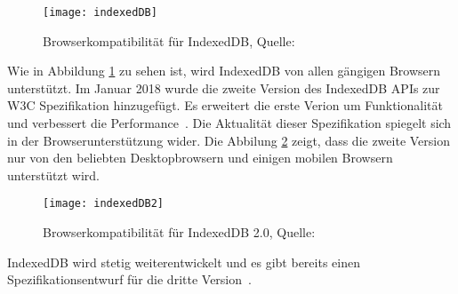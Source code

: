 \begin{figure}[H]
	\centering
	\texttt{[image: indexedDB]}
	\grayRule
	\caption{Browserkompatibilität für IndexedDB, Quelle: ~\cite{caniuse-idb}}
	\label{fig:indexedDB}
\end{figure}
Wie in Abbildung \ref{fig:indexedDB} zu sehen ist, wird IndexedDB von allen gängigen Browsern unterstützt. 
%
Im Januar 2018 wurde die zweite Version des IndexedDB \glspl{API} zur W3C Spezifikation hinzugefügt. Es erweitert die erste Verion um Funktionalität und verbessert die Performance~\cite{idb2}.
Die Aktualität dieser Spezifikation spiegelt sich in der Browserunterstützung wider. Die Abbilung \ref{fig:indexedDB2} zeigt, dass die zweite Version nur von den beliebten  Desktopbrowsern und einigen mobilen Browsern unterstützt wird. 
\begin{figure}[H]
	\centering
	\texttt{[image: indexedDB2]}
	\grayRule
	\caption{Browserkompatibilität für IndexedDB 2.0, Quelle: ~\cite{caniuse-idb}}
	\label{fig:indexedDB2}
\end{figure}
IndexedDB wird stetig weiterentwickelt und es gibt bereits einen Spezifikationsentwurf für die dritte Version~\cite{idb3}. 